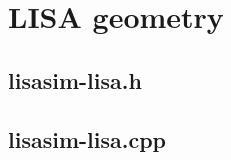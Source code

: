 \documentclass[onesided]{book}
\begin{document}
\section{LISA geometry}

\subsection{lisasim-lisa.h}



\subsection{lisasim-lisa.cpp}


\end{document}
